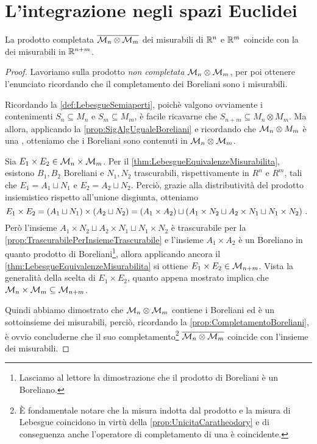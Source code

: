 \section{L'integrazione negli spazi Euclidei}

\begin{proposition}\label{prop:MisuraProdottoEuclidea}
	La \sigalg{} prodotto completata $\overline{\mathcal M_n\otimes\mathcal M_m}$ dei misurabili di $\mathbb R^n$ e $\mathbb R^m$ coincide con la \sigalg{} dei misurabili in $\mathbb R^{n+m}$.
\end{proposition}
\begin{proof}
	Lavoriamo sulla \sigalg{} prodotto \emph{non completata} $\mathcal M_n\otimes\mathcal M_m$, per poi ottenere l'enunciato ricordando che il completamento dei Boreliani sono i misurabili.

	Ricordando la \cref{def:LebesgueSemiaperti}, poichè valgono ovviamente i contenimenti $S_n\subseteq M_n$ e $S_m\subseteq M_m$, è facile ricavarne che $S_{n+m}\subseteq M_n\otimes M_m$.
	Ma allora, applicando la \cref{prop:SigAlgUgualeBoreliani} e ricordando che $\mathcal M_n\otimes M_m$ è una \sigalg{}, otteniamo che i Boreliani sono contenuti in $\mathcal M_n\otimes\mathcal M_m$.
	
	Sia $E_1\times E_2\in \mathcal M_n\times\mathcal M_m$. Per il \cref{thm:LebesgueEquivalenzeMisurabilita}, esistono $B_1,B_2$ Boreliani e $N_1,N_2$ trascurabili, rispettivamente in $R^n$ e $R^m$, tali che $E_1=A_1\sqcup N_1$ e $E_2=A_2\sqcup N_2$.
	Perciò, grazie alla distributività del prodotto insiemistico rispetto all'unione disgiunta, otteniamo
	\begin{equation*}
		E_1\times E_2=(A_1\sqcup N_1)\times(A_2\sqcup N_2)=\left(A_1\times A_2\right)\sqcup\left(A_1\times N_2\sqcup A_2\times N_1 \sqcup N_1\times N_2\right) \, \text{. }
	\end{equation*}
	Però l'insieme $A_1\times N_2\sqcup A_2\times N_1 \sqcup N_1\times N_2$ è trascurabile per la \cref{prop:TrascurabilePerInsiemeTrascurabile} e l'insieme $A_1\times A_2$ è un Boreliano in quanto prodotto di Boreliani\footnote{Lasciamo al lettore la dimostrazione che il prodotto di Boreliani è un Boreliano.}, allora applicando ancora il \cref{thm:LebesgueEquivalenzeMisurabilita} si ottiene $E_1\times E_2\in\mathcal M_{n+m}$.
	Vista la generalità della scelta di $E_1\times E_2$, quanto appena mostrato implica che $\mathcal M_n\times\mathcal M_m\subseteq \mathcal M_{n+m}$.
	
	Quindi abbiamo dimostrato che $\mathcal M_n\otimes\mathcal M_m$ contiene i Boreliani ed è un sottoinsieme dei misurabili, perciò, ricordando la \cref{prop:CompletamentoBoreliani}, è ovvio concluderne che il suo completamento\footnote{È fondamentale notare che la misura indotta dal prodotto e la misura di Lebesgue coincidono in virtù della \cref{prop:UnicitaCaratheodory} e di conseguenza anche l'operatore di completamento di una \sigalg{} è coincidente.} $\overline{\mathcal M_n\otimes\mathcal M_m}$ coincide con l'insieme dei misurabili.
\end{proof}



